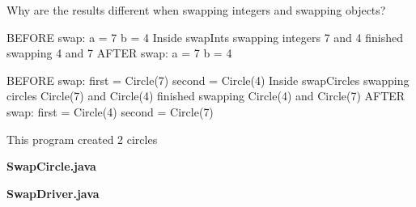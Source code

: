 \Q Why are the results different when swapping integers and swapping objects?

\begin{answer}[14em]
\begin{minipage}{190pt}

\begin{javaans}
BEFORE swap:
a = 7
b = 4
    Inside swapInts
    swapping integers 7 and 4
    finished swapping 4 and 7
AFTER swap:
a = 7
b = 4
\end{javaans}

\end{minipage}
\hspace{1em}
\begin{minipage}{290pt}

\begin{javaans}
BEFORE swap:
first = Circle(7)
second = Circle(4)
	Inside swapCircles
	swapping circles Circle(7) and Circle(4)
	finished swapping Circle(4) and Circle(7)
AFTER swap:
first = Circle(4)
second = Circle(7)
\end{javaans}

\end{minipage}
\begin{javaans}
This program created 2 circles
\end{javaans}
\end{answer}


\newpage

\begin{center}
\large\bf SwapCircle.java
\vspace{-4pt}
\end{center}



\newpage

\begin{center}
\large\bf SwapDriver.java
\vspace{-4pt}
\end{center}

